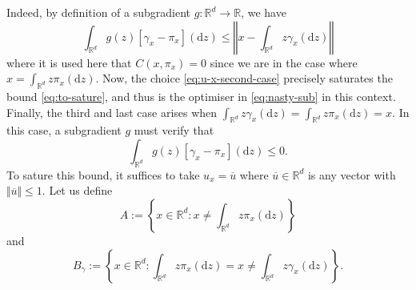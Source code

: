 \documentclass[leqno, 11pt, a4paper]{amsart}
\theoremstyle{definition}
\newcommand{\R}{\mathbb{R}}
\newcommand{\dd}{\mathrm{d}}
\begin{document}
    Indeed, by definition of a subgradient $g : \R^d \to \R$, we have 
    \begin{equation}\label{eq:to-sature}
    \int_{\R^d} g(z) [\gamma_x - \pi_x](\dd z) \leq \left\Vert x - \int_{\R^d} z \gamma_x(\dd z) \right\Vert
    \end{equation}
    where it is used here that $C(x, \pi_x) = 0$ since we are in the case where $x = \int_{\R^d} z \pi_x(\dd z)$. Now, the choice \eqref{eq:u-x-second-case} precisely saturates the bound \eqref{eq:to-sature}, and thus is the optimiser in \eqref{eq:nasty-sub} in this context. Finally, the third and last case arises when $\int_{\R^d} z \gamma_x(\dd z) = \int_{\R^d} z \pi_x(\dd z) = x$. In this case, a subgradient $g$ must verify that 
    $$
    \int_{\R^d} g(z)[\gamma_x - \pi_x](\dd z) \leq 0.
    $$
    To sature this bound, it suffices to take $u_x = \overline{u}$ where $\overline{u} \in \R^d$ is any vector with $\Vert \overline{u} \Vert \leq 1$. Let us define $$A := \left\{x \in \R^d : x \neq \int_{\R^d} z \pi_x(\dd z)\right\}$$ and $$B_\gamma := \left\{x \in \R^d: \int_{\R^d} z \pi_x(\dd z) = x \neq \int_{\R^d} z \gamma_x(\dd z)\right\}.$$
    
\end{document}
